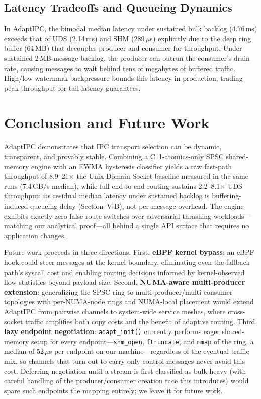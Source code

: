 \documentclass[conference]{IEEEtran}
\begin{document}
\subsection{Latency Tradeoffs and Queueing Dynamics}
\label{sec:latency-tradeoffs}
In AdaptIPC, the bimodal median latency under sustained bulk backlog (4.76\,ms) exceeds that of UDS (2.14\,ms) and SHM (289\,$\mu$s) explicitly due to the deep ring buffer (64\,MB) that decouples producer and consumer for throughput. Under sustained 2\,MB-message backlog, the producer can outrun the consumer's drain rate, causing messages to wait behind tens of megabytes of buffered traffic. High/low watermark backpressure bounds this latency in production, trading peak throughput for tail-latency guarantees.
%
\section{Conclusion and Future Work}
AdaptIPC demonstrates that IPC transport selection can be dynamic,
transparent, and provably stable. Combining a C11-atomics-only SPSC
shared-memory engine with an EWMA hysteresis classifier yields a raw
fast-path throughput of 8.9--21$\times$ the Unix Domain Socket baseline
measured in the same runs (7.4\,GB/s median), while full end-to-end
routing sustains 2.2--8.1$\times$ UDS throughput; its residual median
latency under sustained backlog is buffering-induced queueing delay
(Section~V-B), not per-message overhead. The engine exhibits exactly zero false route
switches over adversarial thrashing workloads---matching our analytical
proof---all behind a single API surface that requires no application changes.

Future work proceeds in three directions. First, \textbf{eBPF kernel bypass}:
an eBPF hook could steer messages at the kernel boundary, eliminating even
the fallback path's syscall cost and enabling routing decisions informed by
kernel-observed flow statistics beyond payload size. Second,
\textbf{NUMA-aware multi-producer extension}: generalizing the SPSC ring to
multi-producer/multi-consumer topologies with per-NUMA-node rings and
NUMA-local placement would extend AdaptIPC from pairwise channels to
system-wide service meshes, where cross-socket traffic amplifies both copy
costs and the benefit of adaptive routing. Third, \textbf{lazy endpoint
negotiation}: \texttt{adapt\_init()} currently performs eager shared-memory
setup for every endpoint---\texttt{shm\_open}, \texttt{ftruncate}, and
\texttt{mmap} of the ring, a median of 52\,$\mu$s per endpoint on our
machine---regardless of the eventual traffic mix, so channels that turn out
to carry only control messages never avoid this cost. Deferring negotiation
until a stream is first classified as bulk-heavy (with careful handling of
the producer/consumer creation race this introduces) would spare such
endpoints the mapping entirely; we leave it for future work.
\end{document}
